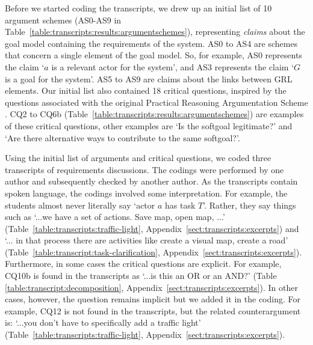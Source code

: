 Before we started coding the transcripts, we drew up an initial list of 10 argument schemes (AS0-AS9 in Table~\ref{table:transcripts:results:argumentschemes}), representing \emph{claims} about the goal model containing the requirements of the system. AS0 to AS4 are schemes that concern a single element of the goal model. So, for example, AS0 represents the claim `$a$ is a relevant actor for the system', and AS3 represents the claim `$G$ is a goal for the system'. AS5 to AS9 are claims about the links between GRL elements. Our initial list also contained 18 critical questions, inspired by the questions associated with the original Practical Reasoning Argumentation Scheme \cite{atkinson2007}. CQ2 to CQ6b (Table~\ref{table:transcripts:results:argumentschemes}) are examples of these critical questions, other examples are `Is the softgoal legitimate?' and `Are there alternative ways to contribute to the same softgoal?'.

Using the initial list of arguments and critical questions, we coded three transcripts of requirements discussions. The codings were performed by one author and subsequently checked by another author. As the transcripts contain spoken language, the codings involved some interpretation. For example, the students almost never literally say `actor $a$ has task $T$'. Rather, they say things such as `...we have a set of actions. Save map, open map, ...' (Table~\ref{table:transcripts:traffic-light}, Appendix~\ref{sect:transcripts:excerpts}) and `... in that process there are activities like create a visual map, create a road' (Table~\ref{table:transcript:task-clarification}, Appendix~\ref{sect:transcripts:excerpts}). Furthermore, in some cases the critical questions are explicit. For example, CQ10b is found in the transcripts as `...is this an OR or an AND?' (Table \ref{table:transcript:decomposition}, Appendix~\ref{sect:transcripts:excerpts}). In other cases, however, the question remains implicit but we added it in the coding. For example, CQ12 is not found in the transcripts, but the related counterargument is:  `...you don't have to specifically add a traffic light' (Table~\ref{table:transcripts:traffic-light}, Appendix~\ref{sect:transcripts:excerpts}). 

